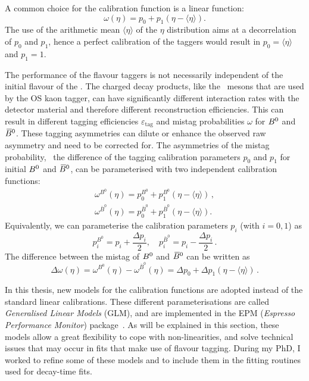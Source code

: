 A common choice for the calibration function is a linear function:
\begin{equation}
	\omega(\eta)=p_0 + p_1\left(\eta-\langle\eta\rangle\right). \label{eq:FTcalibration}
\end{equation}
The use of the arithmetic mean $\langle\eta\rangle$ of the $\eta$ distribution
aims at a decorrelation of $p_0$ and $p_1$, hence a perfect calibration of the
taggers would result in $p_0=\langle\eta\rangle$ and $p_1=1$.

The performance of the flavour taggers is not necessarily independent of the
initial flavour of the \Bz. The charged decay products, like the \Kpm~mesons that are
used by the OS kaon tagger, can have significantly different interaction rates
with the detector material and therefore different reconstruction efficiencies.
This can result in different tagging efficiencies $\varepsilon_\text{tag}$ and
mistag probabilities $\omega$ for $B^0$ and $\kern 0.18em\overline{\kern -0.18em B}{}^0$. These tagging
asymmetries can dilute or enhance the observed raw asymmetry and need to be
corrected for. The asymmetries of the mistag probability, \ie~the difference of
the tagging calibration parameters $p_0$ and $p_1$ for initial $B^0$ and $\kern 0.18em\overline{\kern -0.18em B}{}^0$,
can be parameterised with two independent calibration functions:
\begin{equation}
	\begin{split}
          \label{eq:FTcalibrationSplit}
		\omega^{B^0}(\eta)  = p_0^{B^0}  + p_1^{B^0} \left(\eta-\langle\eta\rangle\right)\,,\\
		\omega^{\bar B^0}(\eta) = p_0^{\bar B^0} + p_1^{\bar B^0} \left(\eta-\langle\eta\rangle\right).
	\end{split}
\end{equation}
Equivalently, we can parameterise the calibration parameters $p_i$ (with $i=0,1$) as
\begin{equation}
	p_i^{B^0}=p_i+\frac{\Delta p_i}{2},\quad p_i^{\bar B^0}=p_i-\frac{\Delta p_i}{2}\,.
\end{equation}
The difference between the mistag of $B^0$ and $\kern 0.18em\overline{\kern -0.18em B}{}^0$ can be written as
\begin{equation}
		\Delta\omega(\eta)=\omega^{B^0}(\eta)-\omega^{\bar B^0}(\eta)=\Delta p_0+\Delta p_1\left(\eta-\langle\eta\rangle\right)\,.
\end{equation}

In this thesis, new models for the calibration functions are adopted instead
of the standard linear calibrations. These different parameterisations are
called \emph{Generalised Linear Models} (GLM), and are implemented in the EPM
(\emph{Espresso Performance Monitor}) package~\cite{EPM}. As will be explained in this section,
these models allow a great flexibility to cope with non-linearities, and solve technical issues
that may occur in fits that make use of flavour tagging. During my PhD, I worked
to refine some of these models and to include them in the fitting routines used for decay-time fits. 

